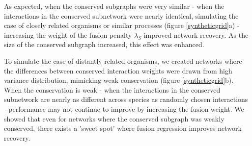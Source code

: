\documentclass[11pt]{article}
\begin{document}
As expected, when the conserved subgraphs were very similar - when the interactions in the conserved subnetwork were nearly identical, simulating the case of closely related organisms or similar processes (figure \ref{syntheticgrid}a) - increasing the weight of the fusion penalty $\lambda_S$ improved network recovery. As the size of the conserved subgraph increased, this effect was enhanced.

To simulate the case of distantly related organisms, we created networks where the differences between conserved interaction weights were drawn from high variance distribution, mimicking weak conservation (figure \ref{syntheticgrid}b). When the conservation is weak - when the interactions in the conserved subnetwork are nearly as different across species as randomly chosen interactions - performance may not continue to improve by increasing the fusion weight. We showed that even for networks where the conserved subgraph was weakly conserved, there exists a 'sweet spot' where fusion regression improves network recovery. 
\end{document}
